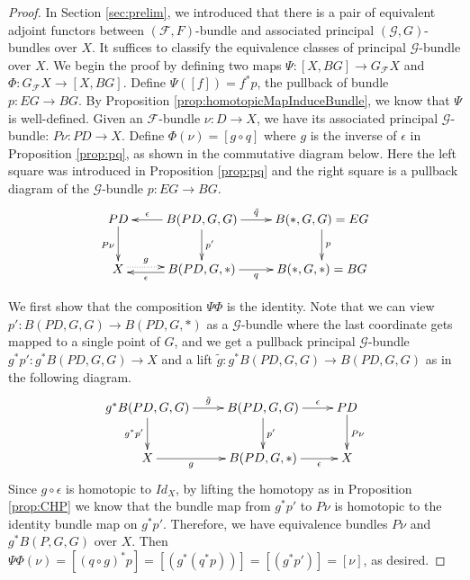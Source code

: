 \documentclass[psamsfonts]{amsart}
\theoremstyle{definition}
\theoremstyle{remark}
\numberwithin{equation}{section}
\begin{document}
\begin{proof}
In Section \ref{sec:prelim}, we introduced that there is a pair of equivalent adjoint functors between $(\mathcal{F}, F)$-bundle and associated principal $(\mathcal{G}, G)$-bundles over $X$. It suffices to classify the equivalence classes of principal $\mathcal{G}$-bundle over $X$. We begin the proof by defining two maps $\Psi: [X, BG] \rightarrow G_{\mathcal{F}}X$ and $\Phi: G_{\mathcal{F}}X \rightarrow [X, BG]$. Define $\Psi([f]) = f^{*}p$, the pullback of bundle $p: EG \rightarrow BG$. By Proposition \ref{prop:homotopicMapInduceBundle}, we know that $\Psi$ is well-defined. Given an  $\mathcal{F}$-bundle $\nu: D \rightarrow X$, we have its associated principal $\mathcal{G}$-bundle: $P\nu: PD \rightarrow X$. Define $\Phi(\nu) = [g \circ q]$ where $g$ is the inverse of $\epsilon$ in Proposition \ref{prop:pq}, as shown in the commutative diagram below. Here the left square was introduced in Proposition \ref{prop:pq} and the right square is a pullback diagram of the $\mathcal{G}$-bundle $p: EG \to BG$.
\label{pic:pq}
\[\xymatrix{
PD \ar[d]_{P\nu} & B(PD, G, G) \ar[l]_-{\epsilon} \ar[d]^{p'} \ar[r]^-{\tilde{q}} & B(*, G, G) = EG \ar[d]^{p} \\
X \ar@{.>}[r]<.5ex>^-{g} & B(PD, G, *) \ar[l]<.5ex>^-{\epsilon} \ar[r]_-{q} & B(*, G, *) = BG \\} \]

We first show that the composition $\Psi\Phi$ is the identity. Note that we can view $p': B(PD, G, G) \to B(PD, G, *)$ as a $\mathcal{G}$-bundle where the last coordinate gets mapped to a single point of $G$, and we get a pullback principal $\mathcal{G}$-bundle $g^{*}p': g^{*}B(PD, G, G) \rightarrow X$ and a lift $\tilde{g}: g^{*}B(PD, G, G) \rightarrow B(PD, G, G)$ as in the following diagram. 
\[\xymatrix{
g^{*}B(PD, G, G) \ar[r]^-{\tilde{g}} \ar[d]_{g^{*}p'} & B(PD, G, G) \ar[d]^{p'} \ar[r]^-{\epsilon} & PD \ar[d]^{P\nu}\\
X \ar[r]_-{g} & B(PD, G, *) \ar[r]_-{\epsilon} & X\\} \]
Since $g \circ \epsilon$ is homotopic to $Id_{X}$, by lifting the homotopy as in Proposition \ref{prop:CHP} we know that the bundle map from $g^{*}p'$ to $P\nu$ is homotopic to the identity bundle map on $g^{*}p'$. Therefore, we have equivalence bundles $P\nu$ and $g^{*}B(P, G, G)$ over $X$. Then $\Psi\Phi(\nu) = [(q \circ g)^{*}p] = [(g^{*}(q^{*}p))] = [(g^{*}p')] = [\nu]$, as desired.


\end{proof}
\end{document}
